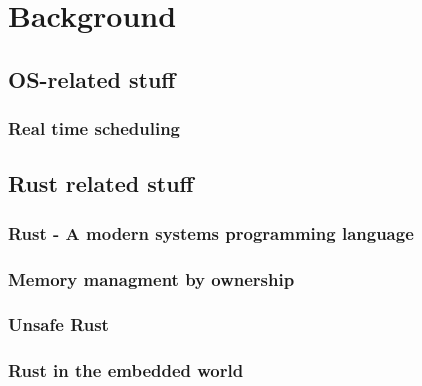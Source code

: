 \chapter{Background}
\label{chap:background}

\begin{comment}
Kurse aus meiner Vertiefung:
    - Prozessorarchitektur
    - Funktionales Programmieren
    - Grundlagen eingebetteter Systeme
    - OS-based programming of embedded systems

- Real Time Linux (PREEMPT-RT specifically)
- Bcm2711 hardware capabilities
- Rust general features over C (Traits, algebraic enums etc)
- Rust embedded ecosystem
- Spi
- 
\end{comment}

\section{OS-related stuff}
\subsection{Real time scheduling}

\section{Rust related stuff}
\subsection{Rust - A modern systems programming language}

\subsection{Memory managment by ownership}

\subsection{Unsafe Rust}

\subsection{Rust in the embedded world}

